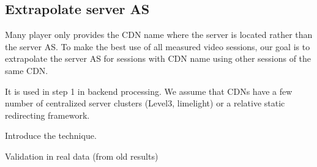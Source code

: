 \subsection{Extrapolate server AS}
Many player only provides the CDN name where the server is located rather than the server AS. To make the best use of all measured video sessions, our goal is to extrapolate the server AS for sessions with CDN name using other sessions of the same CDN.
\begin{packeditemize}
	\item It is used in step 1 in backend processing. We assume that CDNs have a few number of centralized server clusters (Level3, limelight) or a relative static redirecting framework.
	\item Introduce the technique.
	\item Validation in real data (from old results)
\end{packeditemize}


